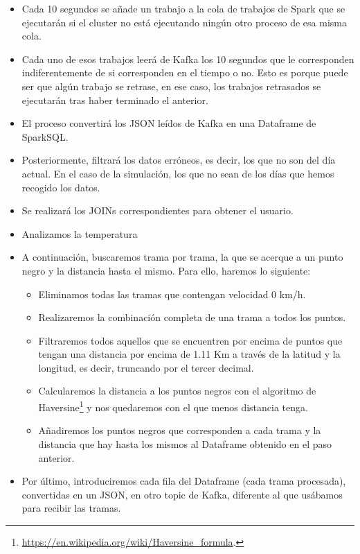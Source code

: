 \begin{itemize}
\item Cada 10 segundos se añade un trabajo a la cola de trabajos de Spark
  que se ejecutarán si el cluster no está ejecutando ningún otro proceso de
  esa misma cola.
\item Cada uno de esos trabajos leerá de Kafka los 10 segundos que le
  corresponden indiferentemente de si corresponden en el tiempo o no. Esto
  es porque puede ser que algún trabajo se retrase, en ese caso, los
  trabajos retrasados se ejecutarán tras haber terminado el anterior.
\item El proceso convertirá los JSON leídos de Kafka en una Dataframe de
  SparkSQL.
\item Posteriormente, filtrará los datos erróneos, es decir, los que no son
  del día actual. En el caso de la simulación, los que no sean de los días
  que hemos recogido los datos.
\item Se realizará los JOINs correspondientes para obtener el usuario.
\item Analizamos la temperatura
\item A continuación, buscaremos trama por trama, la que se acerque a un
  punto negro y la distancia hasta el mismo. Para ello, haremos lo
  siguiente:
  \begin{itemize}
  \item Eliminamos todas las tramas que contengan velocidad 0 km/h.
  \item Realizaremos la combinación completa de una trama a todos los
    puntos.
  \item Filtraremos todos aquellos que se encuentren por encima de puntos
    que tengan una distancia por encima de 1.11 Km a través de la latitud y
    la longitud, es decir, truncando por el tercer decimal.
  \item Calcularemos la distancia a los puntos negros con el algoritmo de
    Haversine\footnote{\url{https://en.wikipedia.org/wiki/Haversine_formula}.}
    y nos quedaremos con el que menos distancia tenga.
  \item Añadiremos los puntos negros que corresponden a cada trama y la
    distancia que hay hasta los mismos al Dataframe obtenido en el paso
    anterior.
  \end{itemize}
\item Por último, introduciremos cada fila del Dataframe (cada trama
  procesada), convertidas en un JSON, en otro topic de Kafka, diferente al
  que usábamos para recibir las tramas.
\end{itemize}


